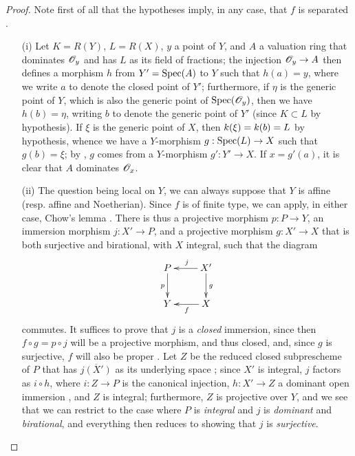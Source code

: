 \begin{proof}
\label{proof-II.7.3.10}
Note first of all that the hypotheses imply, in any case, that $f$ is separated .
\begin{enumerate}
    \item[\rm{(i)}] Let $K=R(Y)$, $L=R(X)$, $y$ a point of $Y$, and $A$ a valuation ring that dominates $\mathscr{O}_y$ and has $L$ as its field of fractions;
        the injection $\sh{O}_y\to A$ then defines a morphism $h$ from $Y'=\operatorname{Spec}(A)$ to $Y$  such that $h(a)=y$, where we write $a$ to denote the closed point of $Y'$;
        furthermore, if $\eta$ is the generic point of $Y$, which is also the generic point of $\operatorname{Spec}(\mathscr{O}_y)$, then we have $h(b)=\eta$, writing $b$ to denote the generic point of $Y'$ (since $K\subset L$ by hypothesis).
        If $\xi$ is the generic point of $X$, then $k(\xi)=k(b)=L$ by hypothesis, whence we have a $Y$-morphism $g:\Spec(L)\to X$ such that $g(b)=\xi$;
        by , $g$ comes from a $Y$-morphism $g':Y'\to X$.
        If $x=g'(a)$, it is clear that $A$ dominates $\mathscr{O}_x$.
    \item[\rm{(ii)}] The question being local on $Y$, we can always suppose that $Y$ is affine (resp. affine and Noetherian).
        Since $f$ is of finite type, we can apply, in either case, Chow's lemma .
        There is thus a projective morphism $p:P\to Y$, an immersion morphism $j:X'\to P$, and a projective morphism $g:X'\to X$ that is both surjective and birational, with $X$ integral, such that the diagram
        \[
            \xymatrix{
                P \ar[d]_p
                & X' \ar[l]_j \ar[d]^g
            \\  Y
                & X \ar[l]^f
            }
        \]
        commutes.
        It suffices to prove that $j$ is a \emph{closed} immersion, since then $f\circ g=p\circ j$ will be a projective morphism, and thus closed, and, since $g$ is surjective, $f$ will also be proper .
        Let $Z$ be the reduced closed subprescheme of $P$ that has $\overline{j(X')}$ as its underlying space ;
        since $X'$ is integral, $j$ factors as $i\circ h$, where $i:Z\to P$ is the canonical injection, $h:X'\to Z$ a dominant open immersion , and $Z$ is integral;
        furthermore, $Z$ is projective over $Y$, and we see that we can restrict to the case where $P$ is \emph{integral} and $j$ is \emph{dominant} and \emph{birational}, and everything then reduces to showing that $j$ is \emph{surjective}.

\end{enumerate}
\end{proof}

